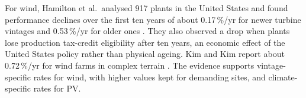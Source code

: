 For wind, Hamilton et al.\ analysed 917 plants in the United States and
found performance declines over the first ten years of about
0.17\,\%/yr for newer turbine vintages and 0.53\,\%/yr for older ones
\cite{hamilton2020}. They also observed a drop when plants lose
production tax-credit eligibility after ten years, an economic effect of
the United States policy rather than physical ageing. Kim and Kim report
about 0.72\,\%/yr for wind farms in complex terrain \cite{kim2025}. The
evidence supports vintage-specific rates for wind, with higher values
kept for demanding sites, and climate-specific rates for PV.
